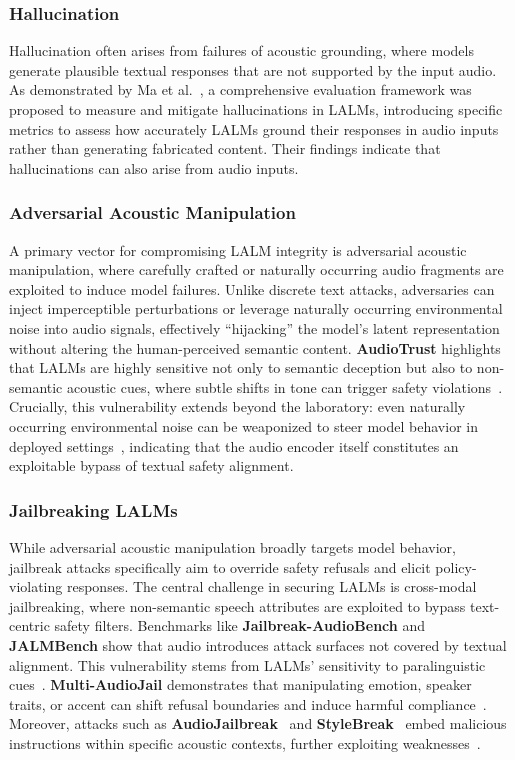 \documentclass{llmxive}
\begin{document}
\subsubsection{Hallucination}
Hallucination often arises from failures of acoustic grounding, where models generate plausible textual responses that are not supported by the input audio.
As demonstrated by Ma et al.~\cite{ma2025towards}, a comprehensive evaluation framework was proposed to measure and mitigate hallucinations in LALMs, introducing specific metrics to assess how accurately LALMs ground their responses in audio inputs rather than generating fabricated content. Their findings indicate that hallucinations can also arise from audio inputs.

\subsubsection{Adversarial Acoustic Manipulation}
A primary vector for compromising LALM integrity is adversarial acoustic manipulation, where carefully crafted or naturally occurring audio fragments are exploited to induce model failures.
Unlike discrete text attacks, adversaries can inject imperceptible perturbations or leverage naturally occurring environmental noise into audio signals, effectively ``hijacking'' the model's latent representation without altering the human-perceived semantic content. \textbf{AudioTrust} highlights that LALMs are highly sensitive not only to semantic deception but also to non-semantic acoustic cues, where subtle shifts in tone can trigger safety violations~\cite{li2025audiotrust}. Crucially, this vulnerability extends beyond the laboratory: even naturally occurring environmental noise can be weaponized to steer model behavior in deployed settings~\cite{sadasivan2025attacker}, indicating that the audio encoder itself constitutes an exploitable bypass of textual safety alignment.


\subsubsection{Jailbreaking LALMs}

While adversarial acoustic manipulation broadly targets model behavior, jailbreak attacks specifically aim to override safety refusals and elicit policy-violating responses. The central challenge in securing LALMs is cross-modal jailbreaking, where non-semantic speech attributes are exploited to bypass text-centric safety filters. Benchmarks like \textbf{Jailbreak-AudioBench} and \textbf{JALMBench} show that audio introduces attack surfaces not covered by textual alignment. This vulnerability stems from LALMs’ sensitivity to paralinguistic cues~\cite{cheng2025jailbreak, peng2025jalmbench, hou2025evaluating}. \textbf{Multi-AudioJail} demonstrates that manipulating emotion, speaker traits, or accent can shift refusal boundaries and induce harmful compliance~\cite{roh2025multilingual}. Moreover, attacks such as \textbf{AudioJailbreak}~\cite{chen2025audiojailbreak} and \textbf{StyleBreak}~\cite{li2025stylebreak} embed malicious instructions within specific acoustic contexts, further exploiting weaknesses~\cite{feng2025investigating}.
\end{document}
